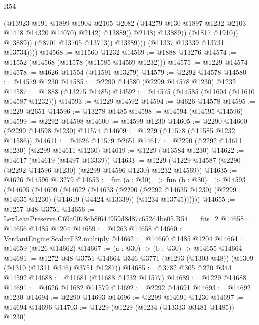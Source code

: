 \begin{lexlean}{R54}
\begin{coremodule}
                                  (@13923
                                    @191
                                    @1899
                                    @1904
                                    @2105
                                    @2082
                                    (@14279 @130 @1897 @1232 @2103 @1418 @14320 @14070)
                                    @2142)
                                  @13889))
                              @2148)
                            @13889))
                        (@1817 @1910))
                      @13889))
                  (@8701 @13705 @13713))
                @13889)))
          (@11337 @13339 @13731 @13734))))
@14568 := @11560 @1232
@14569 := @1888 @13276
@14574 := @11552 (@14568 (@11578 (@11585 @14569 @1232)))
@14575 := @1229 @14574
@14578 := @4626 @11554 (@11591 @13279)
@14579 := @2292 @14578
@14580 := @14579 @1230
@14585 := @2290 @14580 (@2299 @14578 @1230) @1232
@14587 := @1888 (@13275 @1485)
@14592 := @14575 (@14585 (@11604 (@11610 @14587 @1232)))
@14593 := @1229 @14592
@14594 := @4626 @14578
@14595 := @1229 @2651
@14596 := @13278 @1485
@14598 := @14594 (@14595 @14596)
@14599 := @2292 @14598
@14600 := @14599 @1230
@14605 := @2290 @14600 (@2299 @14598 @1230) @11574
@14609 := @1229 (@11578 (@11585 @1232 @11586))
@14611 := @4626 @11579 @2651
@14617 := @2290 (@2292 @14611 @1230) (@2299 @14611 @1230)
@14619 := @1229 (@13584 @1230)
@14622 := @14617 (@14619 (@4497 @13339))
@14633 := @1229 (@1229 @14587 (@2290 (@2292 @14596 @1230) (@2299 @14596 @1230) @1232 @14569))
@14635 := @4626 @14596 @13279
@14653 := fun (a : @30) =>
  fun (b : @30) =>
  @14593
    (@14605
      (@14609
        (@14622
          (@14633
            (@2290
              (@2292 @14635 @1230)
              (@2299 @14635 @1230)
              (@14619 (@4424 @13339))
              (@1234 @13745))))))
@14655 := @1257 @48 @3751
@14656 := LexLeanPreserve.C69a0078cb8f644959d8d87c652d4be05.R54.__fits_2
@14658 := @14656 @1485 @1204
@14659 := @1263 @14658
@14660 := VerdantEngine.ScalarF32.multiply
@14662 := @14660 @1485 @1204
@14664 := @14659 (@126 @14662)
@14667 := (a : @30) -> (b : @30) -> @14655 @14664
@14681 := @1272
    @48
    @3751
    @14664
    @346
    @3771
    (@1293 (@1303 @48))
    (@1309 (@1310 (@1311 @346) @3751 @1287))
@14685 := @3782 @305 @220 @344 @14592
@14688 := @11681 (@11688 @1232 @11577)
@14689 := @1229 @14688
@14691 := @4626 @11682 @11579
@14692 := @2292 @14691
@14693 := @14692 @1230
@14694 := @2290 @14693
@14696 := @2299 @14691 @1230
@14697 := @14694 @14696
@14703 := @1229 (@1229 (@1234 (@13333 @3481 @1485)) @1230)

\end{coremodule}
\end{lexlean}
